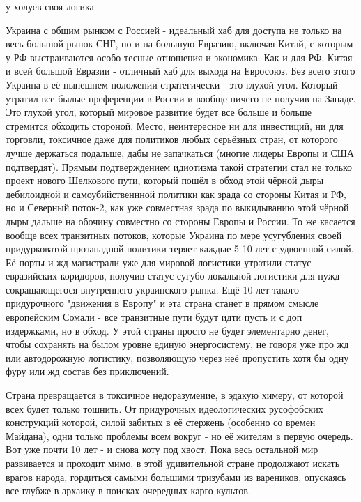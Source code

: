 \begin{itemize}
у холуев своя логика

 

Украина с общим рынком с Россией - идеальный хаб для доступа не только на весь
большой рынок СНГ, но и на большую Евразию, включая Китай, с которым у РФ
выстраиваются особо тесные отношения и экономика. Как и для РФ, Китая и всей
большой Евразии - отличный хаб для выхода на Евросоюз. Без всего этого Украина
в её нынешнем положении стратегически - это глухой угол. Который утратил все
былые преференции в России и вообще ничего не получив на Западе. Это глухой
угол, который мировое развитие будет все больше и больше стремится обходить
стороной. Место, неинтересное ни для инвестиций, ни для торговли, токсичное
даже для политиков любых серьёзных стран, от которого лучше держаться подальше,
дабы не запачкаться (многие лидеры Европы и США подтвердят). Прямым
подтверждением идиотизма такой стратегии стал не только проект нового Шелкового
пути, который пошёл в обход этой чёрной дыры дебилоидной и самоубийственнной
политики как зрада со стороны Китая и РФ, но и Северный поток-2, как уже
совместная зрада по выкидыванию этой чёрной дыры дальше на обочину совместно со
стороны Европы и России. То же касается вообще всех транзитных потоков, которые
Украина по мере усугубления своей придурковатой прозападной политики теряет
каждые 5-10 лет с удвоенной силой. Её порты и жд магистрали уже для мировой
логистики утратили статус евразийских коридоров, получив статус сугубо
локальной логистики для нужд сокращающегося внутреннего украинского рынка. Ещё
10 лет такого придурочного "движения в Европу" и эта страна станет в прямом
смысле европейским Сомали - все транзитные пути будут идти пусть и с доп
издержками, но в обход. У этой страны просто не будет элементарно денег, чтобы
сохранять на былом уровне единую энергосистему, не говоря уже про жд или
автодорожную логистику, позволяющую через неё пропустить хотя бы одну фуру или
жд состав без приключений.

Страна превращается в токсичное недоразумение, в эдакую химеру, от которой всех
будет только тошнить. От придурочных идеологических русофобских конструкций
которой, силой забитых в её стержень (особенно со времен Майдана), одни только
проблемы всем вокруг - но её жителям в первую очередь. Вот уже почти 10 лет - и
снова коту под хвост. Пока весь остальной мир развивается и проходит мимо, в
этой удивительной стране продолжают искать врагов народа, гордиться самыми
большими тризубами из вареников, опускаясь все глубже в архаику в поисках
очередных карго-культов.



\end{itemize}
